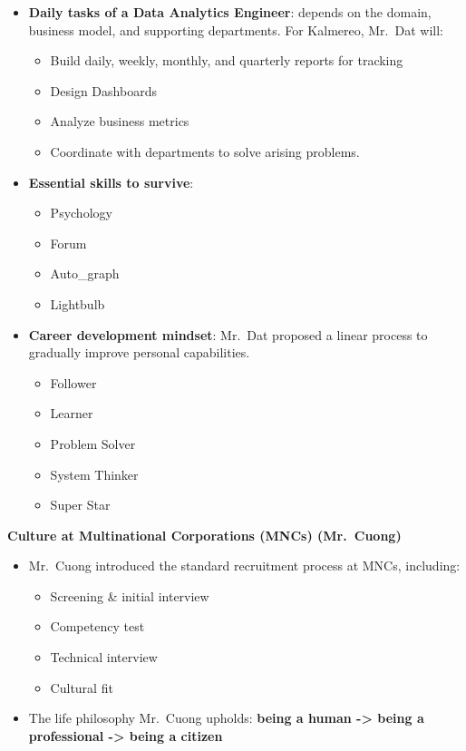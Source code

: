 \begin{itemize}
\tightlist
\item
  \textbf{Daily tasks of a Data Analytics Engineer}: depends on the
  domain, business model, and supporting departments. For Kalmereo,
  Mr.~Dat will:

  \begin{itemize}
  \tightlist
  \item
    Build daily, weekly, monthly, and quarterly reports for tracking
  \item
    Design Dashboards
  \item
    Analyze business metrics
  \item
    Coordinate with departments to solve arising problems.
  \end{itemize}
\item
  \textbf{Essential skills to survive}:

  \begin{itemize}
  \tightlist
  \item
    Psychology
  \item
    Forum
  \item
    Auto\_graph
  \item
    Lightbulb
  \end{itemize}
\item
  \textbf{Career development mindset}: Mr.~Dat proposed a linear process
  to gradually improve personal capabilities.

  \begin{itemize}
  \tightlist
  \item
    Follower
  \item
    Learner
  \item
    Problem Solver
  \item
    System Thinker
  \item
    Super Star
  \end{itemize}
\end{itemize}

\vspace{0.5em}\noindent\textbf{Culture at Multinational Corporations (MNCs)
(Mr.~Cuong)}\par

\begin{itemize}
\tightlist
\item
  Mr.~Cuong introduced the standard recruitment process at MNCs,
  including:

  \begin{itemize}
  \tightlist
  \item
    Screening \& initial interview
  \item
    Competency test
  \item
    Technical interview
  \item
    Cultural fit
  \end{itemize}
\item
  The life philosophy Mr.~Cuong upholds: \textbf{being a human
  -\textgreater{} being a professional -\textgreater{} being a citizen}
\end{itemize}

